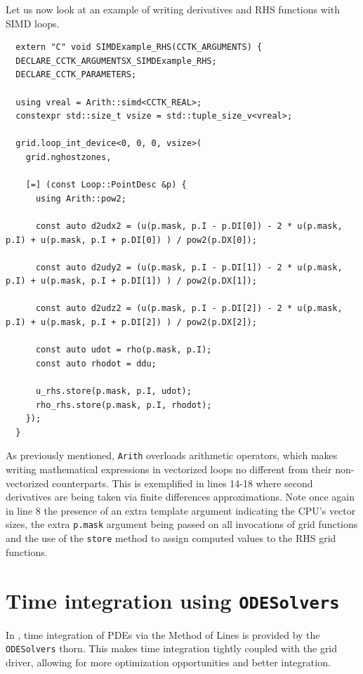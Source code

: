 Let us now look at an example of writing derivatives and RHS functions with SIMD loops.

\begin{lstlisting}
  extern "C" void SIMDExample_RHS(CCTK_ARGUMENTS) {
  DECLARE_CCTK_ARGUMENTSX_SIMDExample_RHS;
  DECLARE_CCTK_PARAMETERS;

  using vreal = Arith::simd<CCTK_REAL>;
  constexpr std::size_t vsize = std::tuple_size_v<vreal>;

  grid.loop_int_device<0, 0, 0, vsize>(
    grid.nghostzones,
    
    [=] (const Loop::PointDesc &p) {
      using Arith::pow2;

      const auto d2udx2 = (u(p.mask, p.I - p.DI[0]) - 2 * u(p.mask, p.I) + u(p.mask, p.I + p.DI[0]) ) / pow2(p.DX[0]);
      
      const auto d2udy2 = (u(p.mask, p.I - p.DI[1]) - 2 * u(p.mask, p.I) + u(p.mask, p.I + p.DI[1]) ) / pow2(p.DX[1]);
      
      const auto d2udz2 = (u(p.mask, p.I - p.DI[2]) - 2 * u(p.mask, p.I) + u(p.mask, p.I + p.DI[2]) ) / pow2(p.DX[2]);

      const auto udot = rho(p.mask, p.I);
      const auto rhodot = ddu;

      u_rhs.store(p.mask, p.I, udot);
      rho_rhs.store(p.mask, p.I, rhodot);
    });
  }
\end{lstlisting}

As previously mentioned, \texttt{Arith} overloads arithmetic operators, which makes writing mathematical expressions in vectorized loops no different from their non-vectorized counterparts. This is exemplified in lines 14-18 where second derivatives are being taken via finite differences approximations. Note once again in line 8 the presence of an extra template argument indicating the CPU's vector sizes, the extra \texttt{p.mask} argument being passed on all invocations of grid functions and the use of the \texttt{store} method to assign computed values to the RHS grid functions.


\section{Time integration using \texttt{ODESolvers}}
\label{sec:odesolvers}

In \CarpetX, time integration of PDEs via the Method of Lines is provided by the \texttt{ODESolvers} thorn. This makes time integration tightly coupled with the grid driver, allowing for more optimization opportunities and better integration.

